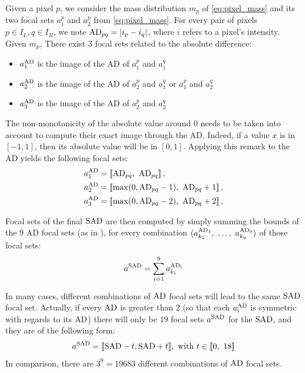 Given a pixel $p$, we consider the mass distribution $m_p$ of \cref{eq:pixel_mass} and its two focal sets $a_1^p$ and $a_2^p$ from \cref{eq:pixel_mass}. For every pair of pixels $p\in I_L, q\in I_R$, we note $\mathrm{AD}_{pq}=|i_p - i_q|$, where $i$ refers to a pixel's intensity. Given $m_p$, There exist $3$ focal sets related to the absolute difference:
\begin{itemize}
    \item $a^{\mathrm{AD}}_1$ is the image of the AD of $a^p_1$ and $a^q_1$
    \item $a^{\mathrm{AD}}_2$ is the image of the AD of $a^p_2$ and $a^q_1$ or $a^p_1$ and $a^q_2$
    \item  $a^{\mathrm{AD}}_3$ is the image of the AD of $a^p_2$ and $a^q_2$
\end{itemize}
The non-monotonicity of the absolute value around $0$ needs to be taken into account to compute their exact image through the AD. Indeed, if a value $x$ is in $[-1,1]$, then its absolute value will be in $[0,1]$. Applying this remark to the AD yields the following focal sets:
\begin{align*}
    a^{\mathrm{AD}}_1&=[\![\mathrm{AD}_{pq},~\mathrm{AD}_{pq}]\!]\,,\\
    a^{\mathrm{AD}}_2&=[\![\max(0, \mathrm{AD}_{pq} - 1),~\mathrm{AD}_{pq} + 1]\!]\,,\\
    a^{\mathrm{AD}}_3&=[\![\max(0, \mathrm{AD}_{pq} - 2),~\mathrm{AD}_{pq} + 2]\!]\,,
\end{align*}

Focal sets of the final $\mathrm{SAD}$ are then computed by simply summing the bounds of the $9$ AD focal sets (as in ), for every combination $(a^{\mathrm{AD}_1}_{k_1}, ~\dots, ~ a^{\mathrm{AD}_9}_{k_9})$ of those focal sets:
\begin{align}
    a^{\mathrm{SAD}}=\sum_{i=1}^9a^{\mathrm{AD}_i}_{k_i}
\end{align}

\begin{remark}
    In many cases, different combinations of $\mathrm{AD}$ focal sets will lead to the same $\mathrm{SAD}$ focal set. Actually, if every $\mathrm{AD}$ is greater than $2$ (so that each $a^{\mathrm{AD}}_i$ is symmetric with regards to its $\mathrm{AD}$) there will only be $19$ focal sets $a^{\mathrm{SAD}}$ for the $\mathrm{SAD}$, and they are of the following form:
    \begin{align}\label{eq:nested_SAD}
        a^{\mathrm{SAD}} = [\![\mathrm{SAD}-t,\mathrm{SAD}+t]\!],\text{ with }t\in[\![0, ~18]\!]
    \end{align}
    In comparison, there are $3^9=19683$ different combinations of $\mathrm{AD}$ focal sets.
\end{remark}

